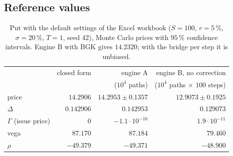 \documentclass[11pt,a4paper]{article}
\theoremstyle{remark}
\begin{document}
\subsection{Reference values}
\begin{table}[ht]\centering\small
\begin{tabular}{@{}lrrr@{}}\toprule
 & closed form & engine A & engine B, no correction\\
 & & ($10^4$ paths) & ($10^4$ paths $\times$ $100$ steps)\\\midrule
price & $14.2906$ & $14.2953\pm0.1357$ & $12.9073\pm0.1925$\\
$\Delta$ & $0.142906$ & $0.142953$ & $0.129073$\\
$\Gamma$ (issue price) & $0$ & $-1.1\cdot10^{-10}$ & $1.9\cdot10^{-11}$\\
vega & $87.170$ & $87.184$ & $79.460$\\
$\rho$ & $-49.379$ & $-49.371$ & $-48.900$\\\bottomrule
\end{tabular}
\caption{Put with the default settings of the Excel workbook ($S=100$, $r=5\,\%$, $\sigma=20\,\%$, $T=1$, seed 42), Monte Carlo
prices with $95\,\%$ confidence intervals. Engine B with BGK gives $14.2320$; with the bridge per step it is unbiased.}
\end{table}

\end{document}
